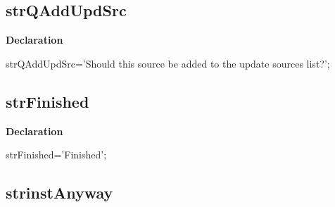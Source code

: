 \documentclass{report}
\newif\ifpdf
\begin{document}
\subsection*{strQAddUpdSrc}
\fi
\label{trstrings-strQAddUpdSrc}
\begin{list}{}{
\setlength{\itemindent}{0cm}
\setlength{\listparindent}{0cm}
\setlength{\leftmargin}{\evensidemargin}
\addtolength{\leftmargin}{\tmplength}
\settowidth{\labelsep}{X}
\addtolength{\leftmargin}{\labelsep}
\setlength{\labelwidth}{\tmplength}
}
\item[\textbf{Declaration}\hfill]
\ifpdf
\begin{flushleft}
\fi
\begin{ttfamily}
strQAddUpdSrc='Should this source be added to the update sources list?';\end{ttfamily}

\ifpdf
\end{flushleft}
\fi

\end{list}
\ifpdf
\subsection*{\large{\textbf{strFinished}}\normalsize\hspace{1ex}\hrulefill}
\else
\subsection*{strFinished}
\fi
\label{trstrings-strFinished}
\begin{list}{}{
\setlength{\itemindent}{0cm}
\setlength{\listparindent}{0cm}
\setlength{\leftmargin}{\evensidemargin}
\addtolength{\leftmargin}{\tmplength}
\settowidth{\labelsep}{X}
\addtolength{\leftmargin}{\labelsep}
\setlength{\labelwidth}{\tmplength}
}
\item[\textbf{Declaration}\hfill]
\ifpdf
\begin{flushleft}
\fi
\begin{ttfamily}
strFinished='Finished';\end{ttfamily}

\ifpdf
\end{flushleft}
\fi

\end{list}
\ifpdf
\subsection*{\large{\textbf{strinstAnyway}}\normalsize\hspace{1ex}\hrulefill}
\else
\end{document}
